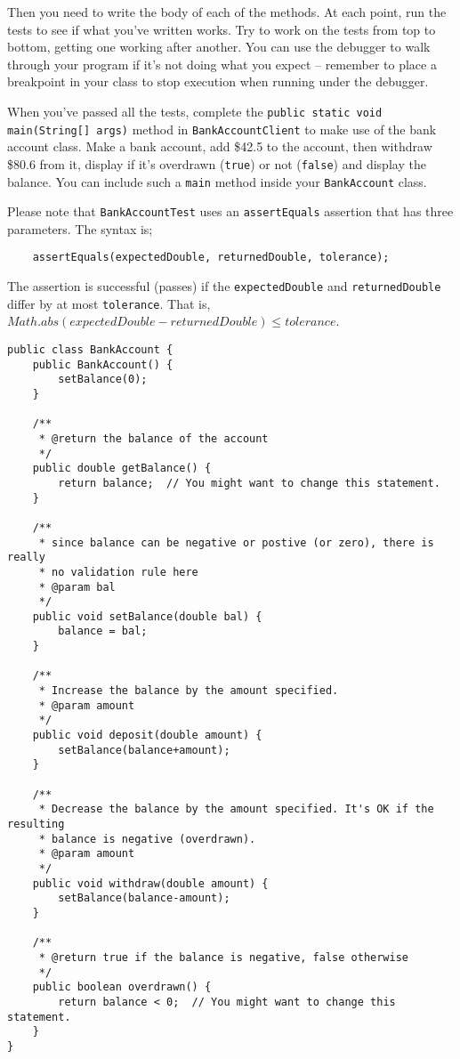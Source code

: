 \begin{questions}
Then you need to write the body of each of the methods. At each point, run the tests to see if what you've written works. Try to work on the tests from top to bottom, getting one working after another. You can use the debugger to walk through your program if it's not doing what you expect -- remember to place a breakpoint in your class to stop execution when running under the debugger.

When you've passed all the tests, complete the \texttt{public static void main(String[] args)} method in \newline \texttt{BankAccountClient} to make use of the bank account class. Make a bank account, add \$42.5 to the account, then withdraw \$80.6 from it, display if it's overdrawn (\texttt{true}) or not (\texttt{false}) and display the balance. You can include such a \texttt{main} method inside your \texttt{BankAccount} class.

Please note that \texttt{BankAccountTest} uses an \texttt{assertEquals} assertion that has three parameters. The syntax is;

\begin{lstlisting}
	assertEquals(expectedDouble, returnedDouble, tolerance);
\end{lstlisting}

The assertion is successful (passes) if the \texttt{expectedDouble} and \texttt{returnedDouble} differ by at most \texttt{tolerance}. That is, $Math.abs(expectedDouble - returnedDouble) \le tolerance$.

\begin{solution}
\begin{lstlisting}
public class BankAccount {
	public BankAccount() {
		setBalance(0);
	}
	
	/**
	 * @return the balance of the account
	 */
	public double getBalance() {
		return balance;  // You might want to change this statement.
	}
	
	/**
	 * since balance can be negative or postive (or zero), there is really 
	 * no validation rule here
	 * @param bal
	 */
	public void setBalance(double bal) {
		balance = bal;
	}

	/**
	 * Increase the balance by the amount specified.
	 * @param amount
	 */
	public void deposit(double amount) {
		setBalance(balance+amount);
	}

	/**
	 * Decrease the balance by the amount specified. It's OK if the resulting
	 * balance is negative (overdrawn).
	 * @param amount
	 */
	public void withdraw(double amount) {
		setBalance(balance-amount);
	}

	/**
	 * @return true if the balance is negative, false otherwise
	 */
	public boolean overdrawn() {
		return balance < 0;  // You might want to change this statement.
	}
}
\end{lstlisting}
\end{solution}
\end{questions}

